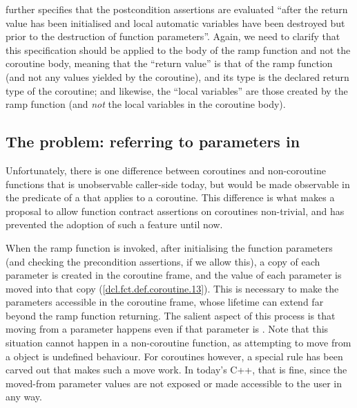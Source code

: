 \cite{P2900R8} further specifies that the postcondition assertions are evaluated ``after the return value has been initialised and local automatic variables have been destroyed but prior to the destruction of function parameters''. Again, we need to clarify that this specification should be applied to the body of the ramp function and not the coroutine body, meaning that the ``return value'' is that of the ramp function (and not any values yielded by the coroutine), and its type is the declared return type of the coroutine; and likewise, the ``local variables'' are those created by the ramp function (and \emph{not} the local variables in the coroutine body).

\subsection{The problem: referring to parameters in }
\label{paramsinpost}

Unfortunately, there is one difference between coroutines and non-coroutine functions that is unobservable caller-side today, but would be made observable in the predicate of a  that applies to a coroutine. This difference is what makes a proposal to allow function contract assertions on coroutines non-trivial, and has prevented the adoption of such a feature until now.

When the ramp function is invoked, after initialising the function parameters (and checking the precondition assertions, if we allow this), a copy of each parameter is created in the coroutine frame, and the value of each parameter is moved into that copy ([\href{https://eel.is/c++draft/dcl.fct.def.coroutine#13}{dcl.fct.def.coroutine.13}]). This is necessary to make the parameters accessible in the coroutine frame, whose lifetime can extend far beyond the ramp function returning. The salient aspect of this process is that moving from a parameter happens even if that parameter is . Note that this situation cannot happen in a non-coroutine function, as attempting to move from a  object is undefined behaviour. For coroutines however, a special rule has been carved out that makes such a move work. In today's C++, that is fine, since the moved-from parameter values are not exposed or made accessible to the user in any way.

